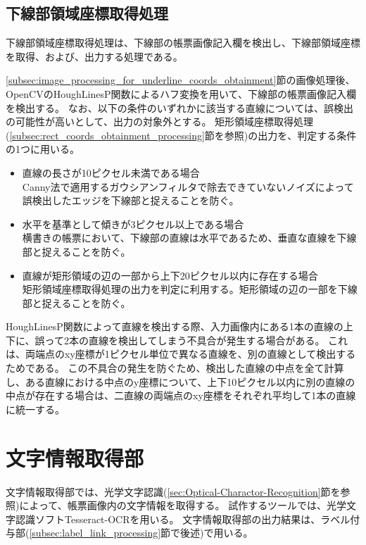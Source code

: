 \subsection{下線部領域座標取得処理}\label{subsec:underline_coords_obtainment_processing}
下線部領域座標取得処理は、下線部の帳票画像記入欄を検出し、下線部領域座標を取得、および、出力する処理である。

\ref{subsec:image_processing_for_underline_coords_obtainment}節の画像処理後、OpenCVのHoughLinesP関数によるハフ変換を用いて、下線部の帳票画像記入欄を検出する。
なお、以下の条件のいずれかに該当する直線については、誤検出の可能性が高いとして、出力の対象外とする。
矩形領域座標取得処理(\ref{subsec:rect_coords_obtainment_processing}節を参照)の出力を、判定する条件の1つに用いる。

\begin{itemize}
    \item 直線の長さが10ピクセル未満である場合\\
        Canny法で適用するガウシアンフィルタで除去できていないノイズによって誤検出したエッジを下線部と捉えることを防ぐ。
    \item 水平を基準として傾きが3ピクセル以上である場合\\
        横書きの帳票において、下線部の直線は水平であるため、垂直な直線を下線部と捉えることを防ぐ。
    \item 直線が矩形領域の辺の一部から上下20ピクセル以内に存在する場合\\
        矩形領域座標取得処理の出力を判定に利用する。矩形領域の辺の一部を下線部と捉えることを防ぐ。
\end{itemize}

HoughLinesP関数によって直線を検出する際、入力画像内にある1本の直線の上下に、誤って2本の直線を検出してしまう不具合が発生する場合がある。
これは、両端点のxy座標が1ピクセル単位で異なる直線を、別の直線として検出するためである。
この不具合の発生を防ぐため、検出した直線の中点を全て計算し、ある直線における中点のy座標について、上下10ピクセル以内に別の直線の中点が存在する場合は、二直線の両端点のxy座標をそれぞれ平均して1本の直線に統一する。

\section{文字情報取得部}\label{sec:OCR_part}
文字情報取得部では、光学文字認識(\ref{sec:Optical-Charactor-Recognition}節を参照)によって、帳票画像内の文字情報を取得する。
試作するツールでは、光学文字認識ソフトTesseract-OCR\cite{Tesseract-OCR}を用いる。
文字情報取得部の出力結果は、ラベル付与部(\ref{subsec:label_link_processing}節で後述)で用いる。

